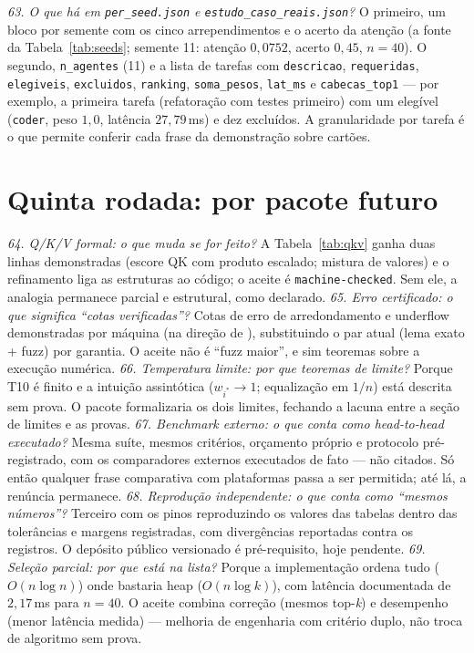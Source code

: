 \textit{63. O que há em \nolinkurl{per_seed.json} e \nolinkurl{estudo_caso_reais.json}?} O primeiro, um bloco por semente com os cinco arrependimentos e o acerto da atenção (a fonte da Tabela~\ref{tab:seeds}; semente 11: atenção $0{,}0752$, acerto $0{,}45$, $n=40$). O segundo, \texttt{n\_agentes} (11) e a lista de tarefas com \texttt{descricao}, \texttt{requeridas}, \texttt{elegiveis}, \texttt{excluidos}, \texttt{ranking}, \texttt{soma\_pesos}, \texttt{lat\_ms} e \texttt{cabecas\_top1} --- por exemplo, a primeira tarefa (refatoração com testes primeiro) com um elegível (\texttt{coder}, peso $1{,}0$, latência $27{,}79$\,ms) e dez excluídos. A granularidade por tarefa é o que permite conferir cada frase da demonstração sobre cartões.
\section{Quinta rodada: por pacote futuro}
\textit{64. Q/K/V formal: o que muda se for feito?} A Tabela~\ref{tab:qkv} ganha duas linhas demonstradas (escore QK com produto escalado; mistura de valores) e o refinamento liga as estruturas ao código; o aceite é \texttt{machine-checked}. Sem ele, a analogia permanece parcial e estrutural, como declarado.
\textit{65. Erro certificado: o que significa ``cotas verificadas''?} Cotas de erro de arredondamento e underflow demonstradas por máquina (na direção de \cite{bagnara2019,murray2026}), substituindo o par atual (lema exato + fuzz) por garantia. O aceite não é ``fuzz maior'', e sim teoremas sobre a execução numérica.
\textit{66. Temperatura limite: por que teoremas de limite?} Porque T10 é finito e a intuição assintótica ($w_{i^*}\to1$; equalização em $1/n$) está descrita sem prova. O pacote formalizaria os dois limites, fechando a lacuna entre a seção de limites e as provas.
\textit{67. Benchmark externo: o que conta como head-to-head executado?} Mesma suíte, mesmos critérios, orçamento próprio e protocolo pré-registrado, com os comparadores externos executados de fato --- não citados. Só então qualquer frase comparativa com plataformas passa a ser permitida; até lá, a renúncia permanece.
\textit{68. Reprodução independente: o que conta como ``mesmos números''?} Terceiro com os pinos reproduzindo os valores das tabelas dentro das tolerâncias e margens registradas, com divergências reportadas contra os registros. O depósito público versionado é pré-requisito, hoje pendente.
\textit{69. Seleção parcial: por que está na lista?} Porque a implementação ordena tudo ($O(n\log n)$) onde bastaria heap ($O(n\log k)$), com latência documentada de $2{,}17$\,ms para $n=40$. O aceite combina correção (mesmos top-\textit{k}) e desempenho (menor latência medida) --- melhoria de engenharia com critério duplo, não troca de algoritmo sem prova.
